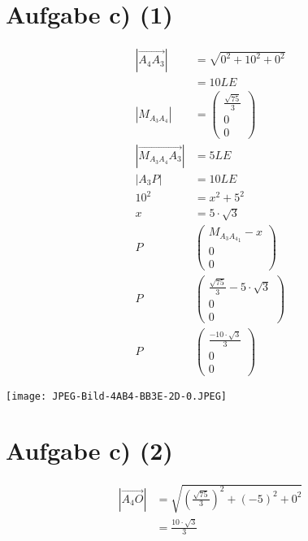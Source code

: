 \documentclass[12pt,a4paper]{report}
\begin{document}
\section{Aufgabe c) (1)}

\begin{align*}
	|\overrightarrow{A_4A_3}| &= 	\sqrt{0^2 + 10^2 + 0^2} \\
	&= 10LE \\
	|M_{A_3A_4}| &= \begin{pmatrix}
		\frac{\sqrt{75}}{3} \\ 0 \\ 0
	\end{pmatrix}\\
	|\overrightarrow{M_{A_3A_4}A_3}| &= 5LE \\
	|A_3P| &= 10LE \\
	10^2 &= x^2 + 5^2 \\
	x &= 5 \cdot \sqrt{3} \\
	P&\begin{pmatrix}
		M_{A_3A_4}_1 - x \\ 0 \\ 0
	\end{pmatrix} \\
	P&\begin{pmatrix}
		\frac{\sqrt{75}}{3} - 5 \cdot \sqrt{3} \\ 0 \\ 0
	\end{pmatrix} \\
	P&\begin{pmatrix}
		\frac{-10\cdot \sqrt{3}}{3} \\ 0 \\ 0
	\end{pmatrix}
\end{align*}

\texttt{[image: JPEG-Bild-4AB4-BB3E-2D-0.JPEG]}


\section{Aufgabe c) (2)}
\begin{align*}
	|\overrightarrow{A_4O}| &= \sqrt{(\frac{\sqrt{75}}{3})^2 +(-5)^2 + 0^2} \\
	&= \frac{10 \cdot \sqrt{3}}{3}
\end{align*}
\end{document}
